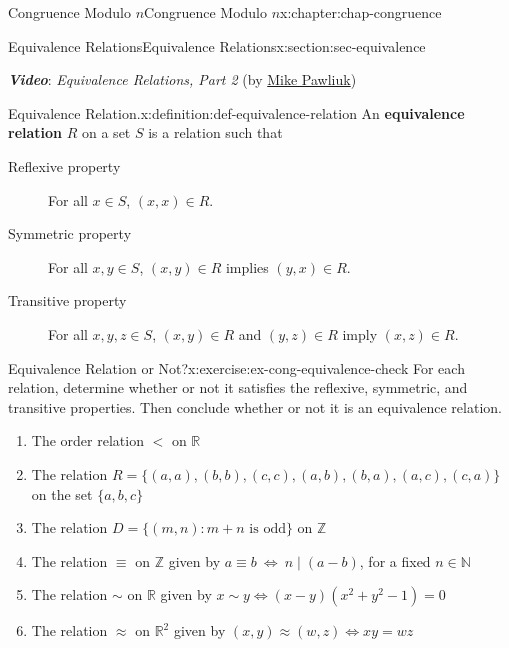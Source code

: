 \documentclass[oneside,10pt,]{book}
\newcommand{\alert}[1]{\textbf{\textit{#1}}}
\newcommand{\terminology}[1]{\textbf{#1}}
\numberwithin{equation}{section}
\newlength{\qrsize}
\newlength{\previewwidth}
\newcommand{\lt}{<}
\begin{document}
\begin{chapterptx}{Congruence Modulo \(n\)}{}{Congruence Modulo \(n\)}{}{}{x:chapter:chap-congruence}
\begin{sectionptx}{Equivalence Relations}{}{Equivalence Relations}{}{}{x:section:sec-equivalence}
\par
\alert{Video}: \emph{Equivalence Relations, Part 2} (by \href{https://www.youtube.com/channel/UCnzqLoGhxAA46i9xcPHZavQ}{Mike Pawliuk})%
\begin{definition}{Equivalence Relation.}{x:definition:def-equivalence-relation}%
An \terminology{equivalence relation} \(R\) on a set \(S\) is a relation such that%
\begin{description}
\item[{Reflexive property}]For all \(x \in S\), \((x,x) \in R\).%
\item[{Symmetric property}]For all \(x, y \in S\), \((x,y) \in R\) implies \((y,x) \in R\).%
\item[{Transitive property}]For all \(x, y, z \in S\), \((x,y) \in R\) and \((y,z) \in R\) imply \((x,z) \in R\).%
\end{description}
%
\end{definition}
\begin{inlineexercise}{Equivalence Relation or Not?}{x:exercise:ex-cong-equivalence-check}%
For each relation, determine whether or not it satisfies the reflexive, symmetric, and transitive properties. Then conclude whether or not it is an equivalence relation.%
\begin{enumerate}[label=(\alph*)]
\item{}The order relation \(\lt\) on \(\mathbb{R}\)%
\item{}The relation \(R = \{(a,a),(b,b),(c,c),(a,b),(b,a),(a,c),(c,a)\}\) on the set \(\{a,b,c\}\)%
\item{}The relation \(D = \{(m,n): m + n \text{ is odd} \}\) on \(\mathbb{Z}\)%
\item{}The relation \(\equiv\) on \(\mathbb{Z}\) given by \(a \equiv b \ \Leftrightarrow \ n \mid (a-b)\), for a fixed \(n \in \mathbb{N}\)%
\item{}The relation \(\sim\) on \(\mathbb{R}\) given by \(x \sim y \Leftrightarrow (x-y)(x^2+y^2-1) = 0\)%
\item{}The relation \(\approx\) on \(\mathbb{R}^2\) given by \((x,y) \approx (w,z) \Leftrightarrow xy = wz\)%
\end{enumerate}
%
\end{inlineexercise}%
\begin{sidebyside}{1}{0}{0}{0}%
\begin{sbspanel}{1}%
\setlength{\qrsize}{9em}
\setlength{\previewwidth}{\linewidth}
\addtolength{\previewwidth}{-\qrsize}
\begin{tcbraster}[raster columns=2, raster column skip=1pt, raster halign=center, raster force size=false, raster left skip=0pt, raster right skip=0pt]%

\end{tcbraster}
\end{sbspanel}
\end{sidebyside}
\end{sectionptx}
\end{chapterptx}
\end{document}
